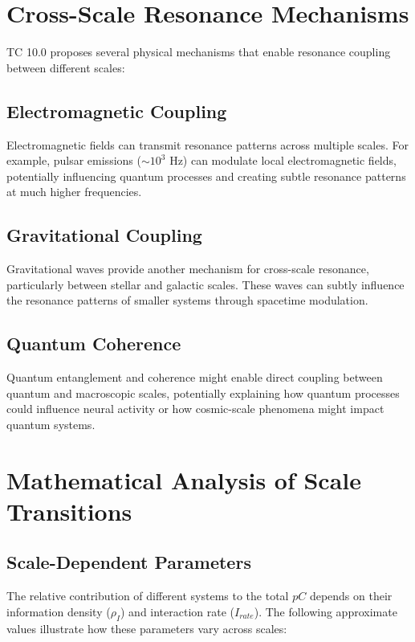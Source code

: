 \documentclass[12pt]{article}
\begin{document}
\section{Cross-Scale Resonance Mechanisms}

TC 10.0 proposes several physical mechanisms that enable resonance coupling between different scales:

\subsection{Electromagnetic Coupling}

Electromagnetic fields can transmit resonance patterns across multiple scales. For example, pulsar emissions ($\sim 10^{3}$ Hz) can modulate local electromagnetic fields, potentially influencing quantum processes and creating subtle resonance patterns at much higher frequencies.

\subsection{Gravitational Coupling}

Gravitational waves provide another mechanism for cross-scale resonance, particularly between stellar and galactic scales. These waves can subtly influence the resonance patterns of smaller systems through spacetime modulation.

\subsection{Quantum Coherence}

Quantum entanglement and coherence might enable direct coupling between quantum and macroscopic scales, potentially explaining how quantum processes could influence neural activity or how cosmic-scale phenomena might impact quantum systems.

\section{Mathematical Analysis of Scale Transitions}

\subsection{Scale-Dependent Parameters}

The relative contribution of different systems to the total $pC$ depends on their information density ($ρ_I$) and interaction rate ($I_{rate}$). The following approximate values illustrate how these parameters vary across scales:
\end{document}
